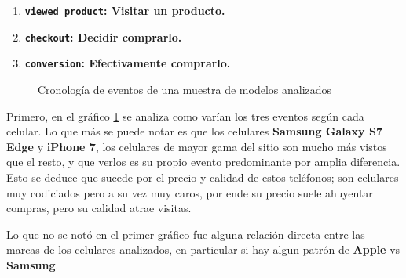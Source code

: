 \documentclass[a4paper]{article}
\begin{document}
\begin{enumerate}
\item \textbf{\texttt{viewed product}: Visitar un producto.}
\item \textbf{\texttt{checkout}: Decidir comprarlo.}
\item \textbf{\texttt{conversion}: Efectivamente comprarlo.}
\end{enumerate}

\begin{figure}[!h]
	\caption{Cronología de eventos de una muestra de modelos analizados}
	\label{fig:prominentes}
\end{figure}

Primero, en el gráfico \ref{fig:prominentes} se analiza como varían los tres eventos según cada celular. Lo que más se puede notar es que los celulares \textbf{Samsung Galaxy S7 Edge} y \textbf{iPhone 7}, los celulares de mayor gama del sitio son mucho más vistos que el resto, y que verlos es su propio evento predominante por amplia diferencia. Esto se deduce que sucede por el precio y calidad de estos teléfonos; son celulares muy codiciados pero a su vez muy caros, por ende su precio suele ahuyentar compras, pero su calidad atrae visitas.

Lo que no se notó en el primer gráfico fue alguna relación directa entre las marcas de los celulares analizados, en particular si hay algun patrón de \textbf{Apple} vs \textbf{Samsung}.
\end{document}
